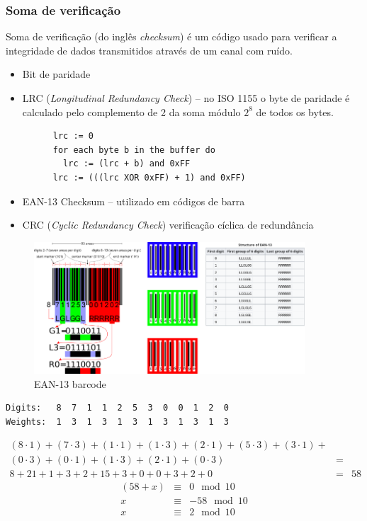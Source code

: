\documentclass[portuguese,aspectratio=169]{beamer}
\begin{document}
\begin{frame}
\frametitle{Soma de verificação}
Soma de verificação (do inglês \emph{checksum}) é um código usado para verificar a integridade de dados transmitidos através de um canal com ruído.

\begin{itemize}
  \item Bit de paridade
  \item LRC (\emph{Longitudinal Redundancy Check}) -- no ISO 1155 o byte de paridade é calculado
    pelo complemento de 2 da soma módulo $2^8$ de todos os bytes.
    \begin{verbatim}
      lrc := 0
      for each byte b in the buffer do
        lrc := (lrc + b) and 0xFF
      lrc := (((lrc XOR 0xFF) + 1) and 0xFF)
    \end{verbatim}
  \item EAN-13 Checksum -- utilizado em códigos de barra
  \item CRC (\emph{Cyclic Redundancy Check}) verificação cíclica de redundância
\end{itemize}

\framebreak
\begin{figure}
  \centering
  \includegraphics[keepaspectratio,width=0.9\textwidth,height=0.7\textheight]{EAN-13.png}
  \caption{EAN-13 barcode}\label{fig-EAN13}
\end{figure}

\framebreak
\begin{verbatim}
Digits:   8  7  1  1  2  5  3  0  0  1  2  0
Weights:  1  3  1  3  1  3  1  3  1  3  1  3
\end{verbatim}
\begin{eqnarray}
  (8 \cdot 1)+(7 \cdot 3)+(1 \cdot 1)+(1 \cdot 3)+(2 \cdot 1)+(5 \cdot 3)+(3 \cdot 1)+&\nonumber\\
  (0 \cdot 3)+(0 \cdot 1)+(1 \cdot 3)+(2 \cdot 1) + (0 \cdot 3) &=&\nonumber\\
  8+21+1+3+2+15+3+0+0+3+2+0 &=& 58
\end{eqnarray}
\begin{eqnarray}
  (58+x) &\equiv& 0 \mod 10 \nonumber\\
  x &\equiv& -58 \mod 10 \nonumber\\
  x &\equiv& 2 \mod 10
\end{eqnarray}


\end{frame}
\end{document}
